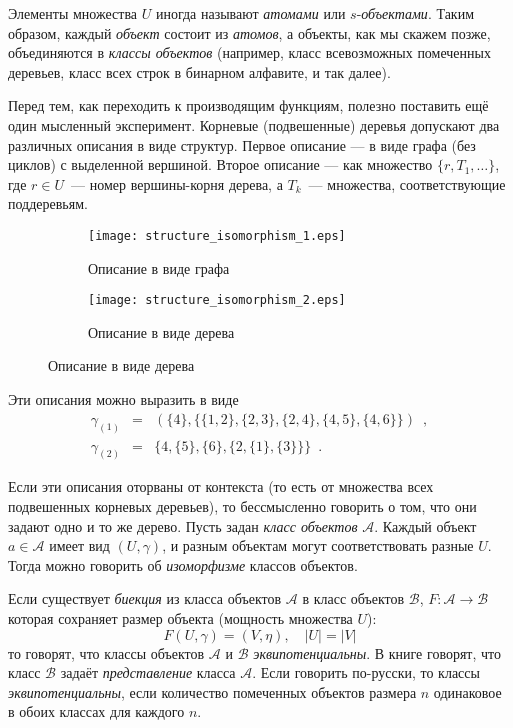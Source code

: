 \documentclass[a5paper]{article}
\theoremstyle{definition}
\begin{document}
Элементы множества \( U \) иногда называют \textit{атомами} или \( s 
\)-\textit{объектами}. Таким образом, каждый \textit{объект} состоит из 
\textit{атомов}, а объекты, как мы скажем позже, объединяются в \textit{классы 
объектов} (например, класс всевозможных помеченных деревьев, класс всех строк в 
бинарном алфавите, и так далее).

Перед тем, как переходить к производящим функциям, полезно 
поставить ещё один мысленный эксперимент. Корневые (подвешенные) деревья 
допускают два различных описания в виде структур. Первое описание --- в виде 
графа (без циклов) с выделенной вершиной. Второе описание --- как множество \( 
\{ r, T_1, \ldots \} \), где \( r \in U \)~--- номер вершины-корня дерева, а \( 
T_k \)~--- множества, соответствующие поддеревьям.

	\begin{figure}[h]
	\centering
    \begin{subfigure}{.5\textwidth}
    	\centering
		\texttt{[image: structure\_isomorphism\_1.eps]}
		\caption{Описание в виде графа}
		\label{fig:iso_1}	
	\end{subfigure}%
    \begin{subfigure}{.34\textwidth}
		\centering
		\texttt{[image: structure\_isomorphism\_2.eps]}
		\caption{Описание в виде дерева}
		\label{fig:iso_2}	
	\end{subfigure}%
    \end{figure}

Эти описания можно выразить в виде
\begin{eqnarray*}
	\gamma_{(1)} &=& (
		\{ 4 \}, \{ \{ 1,2 \}, \{2,3\}, \{2,4\}, \{4,5\}, \{4,6\} \}
	) \enspace ,\\
	\gamma_{(2)} &=& \{
		4, \{5\}, \{6\}, \{
			2, \{1\}, \{3\}
		\}
	\} \enspace .
\end{eqnarray*}

Если эти описания оторваны от контекста (то есть от множества всех подвешенных 
корневых деревьев), то бессмысленно говорить о том, что они задают одно и то же 
дерево. Пусть задан \textit{класс объектов} \( \mathcal A \). Каждый объект \( 
a \in \mathcal A \) имеет вид \( (U, \gamma) \), и разным объектам могут 
соответствовать разные \( U \). Тогда можно говорить об \textit{изоморфизме} 
классов объектов.

Если существует \textit{биекция} из класса объектов \( \mathcal A \) в класс 
объектов \( \mathcal B \), \( F \colon \mathcal A \to \mathcal B \) которая 
сохраняет размер объекта (мощность множества \( U \)):
\[
	F(U, \gamma) = (V, \eta), \quad |U| = |V|
\]
то говорят, что классы объектов \( \mathcal A \) и \( \mathcal B \) 
\textit{эквипотенциальны}. 
В книге \cite{gouldenjackson} говорят, что класс \( \mathcal B \) задаёт 
\textit{представление} класса \( \mathcal A \). Если говорить по-русски, то 
классы \textit{эквипотенциальны}, если количество помеченных объектов размера 
\( n \) одинаковое в обоих классах для каждого \( n \).
\end{document}
